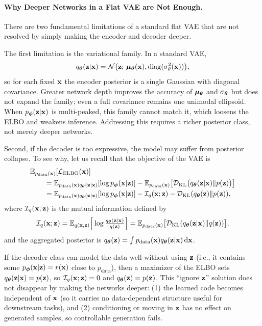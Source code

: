 



\paragraph{Why Deeper Networks in a Flat VAE are Not Enough.} There are two fundamental limitations of a standard flat VAE that are not resolved by simply making the encoder and decoder deeper.


The first limitation is the variational family. In a standard VAE,
\[
q_{\bm{\theta}}({\mathbf{z}}| {\mathbf{x}})=\mathcal N \big({\mathbf{z}};\,\bm{\mu}_{{\bm{\theta}}}({\mathbf{x}}), \operatorname{diag}(\sigma_\theta^2({\mathbf{x}}))\big),
\]
so for each fixed ${\mathbf{x}}$ the encoder posterior is a single Gaussian with diagonal
covariance. Greater network depth improves the accuracy of $\bm{\mu}_{{\bm{\theta}}}$ and
$\sigma_{\bm{\theta}}$ but does not expand the family; even a full covariance remains
one unimodal ellipsoid. When $p_{\bm{\phi}}({\mathbf{z}}| {\mathbf{x}})$ is multi-peaked, this family cannot match it, which loosens the ELBO and
weakens inference. Addressing this requires a richer posterior class, not merely deeper networks.


Second, if the decoder is too expressive, the model may suffer from posterior collapse. To see why, let us recall that the objective of the VAE is
\begin{align*}
&\mathbb{E}_{p_{\text{data}}(\mathbf{x})}[\mathcal L_{\mathrm{ELBO}}({\mathbf{x}})]\\
&\quad\quad=\mathbb{E}_{p_{\text{data}}(\mathbf{x})q_{\bm{\theta}}({\mathbf{z}}|{\mathbf{x}})}[\log p_{\bm{\phi}}({\mathbf{x}}|{\mathbf{z}})]
-\mathbb{E}_{p_{\text{data}}(\mathbf{x})}\big[\mathcal{D}_\mathrm{KL} \big(q_{\bm{\theta}}({\mathbf{z}}|{\mathbf{x}}) \| p({\mathbf{z}})\big)\big]\\
&\quad\quad=\mathbb{E}_{p_{\text{data}}(\mathbf{x})q_{\bm{\theta}}({\mathbf{z}}|{\mathbf{x}})}[\log p_{\bm{\phi}}({\mathbf{x}}|{\mathbf{z}})]-\mathcal I_q({\mathbf{x}};{\mathbf{z}}) - \mathcal{D}_\mathrm{KL}(q_{\bm{\theta}}({\mathbf{z}}) \| p({\mathbf{z}})),
\end{align*}
where $\mathcal I_q({\mathbf{x}};{\mathbf{z}})$ is the mutual information defined by
\[
\mathcal I_q({\mathbf{x}};{\mathbf{z}})
=\mathbb{E}_{q({\mathbf{x}},{\mathbf{z}})} \Big[\log \tfrac{q_{\bm{\theta}}({\mathbf{z}}|{\mathbf{x}})}{q({\mathbf{z}})}\Big]
=\mathbb{E}_{p_{\mathrm{data}}({\mathbf{x}})} \big[\mathcal{D}_\mathrm{KL}(q_{\bm{\theta}}({\mathbf{z}}|{\mathbf{x}}) \| q({\mathbf{z}}))\big],
\]
and the aggregated posterior is $q_{\bm{\theta}}({\mathbf{z}})= \int p_{\mathrm{data}}({\mathbf{x}}) q_{\bm{\theta}}({\mathbf{z}}|{\mathbf{x}}) \mathop{}\!\mathrm{d}{\mathbf{x}}$.

If the decoder class can model the data well without using ${\mathbf{z}}$ (i.e., it contains some $p_{\bm{\phi}}({\mathbf{x}}|{\mathbf{z}})=r({\mathbf{x}})$ close to $p_{\mathrm{data}}$), then a maximizer of the ELBO sets $q_{\bm{\theta}}({\mathbf{z}}|{\mathbf{x}})=p({\mathbf{z}})$, so $\mathcal I_q({\mathbf{x}};{\mathbf{z}})=0$ and $q_{\bm{\theta}}({\mathbf{z}})=p({\mathbf{z}})$. This ``ignore ${\mathbf{z}}$'' solution does not disappear by making the networks deeper: (1) the learned code becomes independent of ${\mathbf{x}}$ (so it carries no data-dependent structure useful for downstream tasks), and (2) conditioning or moving in ${\mathbf{z}}$ has no effect on generated samples, so controllable generation fails.


